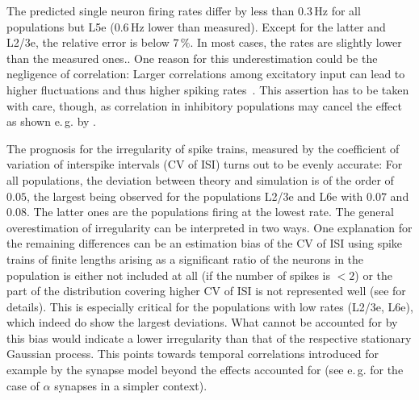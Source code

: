 The predicted single neuron firing rates differ by less than
$0.3$\,Hz for all populations but L5e ($0.6$\,Hz lower than measured). 
Except for the latter and L2/3e, the relative error is below $7\,\%$.
In most cases, the rates are slightly lower than the measured ones..
One reason for this underestimation could be the negligence of correlation: 
Larger correlations among excitatory input can lead to higher fluctuations 
and thus higher spiking rates~\cite{staude2010higher}. This 
assertion has to be taken with care, though, as correlation in inhibitory 
populations may cancel the effect as shown e.\,g. by . 

The prognosis for the irregularity of spike trains, measured by the coefficient of
variation of interspike intervals (CV of ISI) turns out to be evenly accurate:
For all populations, the deviation between theory and simulation is of the order 
of $0.05$, the largest being observed for the populations L2/3e and L6e with $0.07$ 
and $0.08$. The latter ones are the populations firing at the lowest rate. 
The general overestimation of irregularity can be interpreted in two ways. 
One explanation for the remaining differences can be an estimation bias of the CV of ISI 
using spike trains of finite lengths arising as a significant ratio of the neurons in the 
population is either not included at all (if the number of spikes is $ < 2$) or the part of the 
distribution covering higher CV of ISI is not represented well (see  for 
details). This is especially critical for the populations with low rates (L2/3e, L6e), 
which indeed do show the largest deviations.
What cannot be accounted for by this bias would indicate a lower irregularity than that 
of the respective stationary Gaussian process. This points towards temporal correlations
introduced for example by the synapse model beyond the effects accounted for
(see e.\,g.  for the case of $\alpha$ synapses in a simpler context). 

